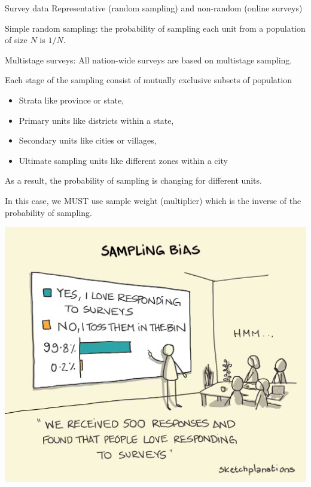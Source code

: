 \documentclass[handout]{beamer}
\begin{document}
\begin{frame}{Survey data}
Representative (random sampling) and non-random (online surveys)\bigskip

Simple random sampling: the probability of sampling each unit from a population of size $N$ is $1/N$.\bigskip

Multistage surveys: All nation-wide surveys are based on multistage sampling.  \bigskip

Each stage of the sampling consist of mutually exclusive subsets of population 
\begin{itemize}
	\item Strata like province or state, 
	\item Primary units like districts within a state, 
	\item Secondary units like cities or villages,
	\item Ultimate sampling units like different zones within a city
\end{itemize}

As a result, the probability of sampling is changing for different units.\medskip

In this case, we MUST use sample weight (multiplier) which is the inverse of the probability of sampling. 

\end{frame}

\begin{frame}
	\begin{center}
		\includegraphics[width=0.9\linewidth]{./Figures/Sampling_bias.png}
	\end{center}
\end{frame}
\end{document}
